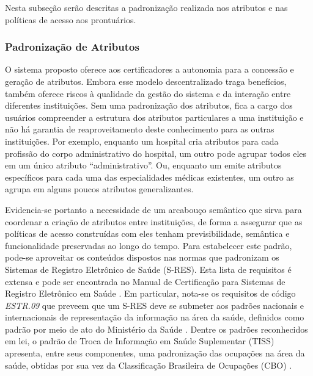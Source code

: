 \documentclass[a4paper,11pt]{article}
\begin{document}
Nesta subseção serão descritas a padronização realizada nos atributos e nas políticas de acesso aos prontuários.

\subsubsection{Padronização de Atributos}
O sistema proposto oferece aos certificadores a autonomia para a concessão e geração de atributos.
Embora esse modelo descentralizado traga benefícios, também oferece riscos à qualidade da gestão do sistema e da interação entre diferentes instituições.
Sem uma padronização dos atributos, fica a cargo dos usuários compreender a estrutura dos atributos particulares a uma instituição e não há garantia de reaproveitamento deste conhecimento para as outras instituições.%
Por exemplo, enquanto um hospital cria atributos para cada profissão do corpo administrativo do hospital, um outro pode agrupar todos eles em um único atributo ``administrativo''.
Ou, enquanto um emite atributos específicos para cada uma das especialidades médicas existentes, um outro as agrupa em alguns poucos atributos generalizantes.

Evidencia-se portanto a necessidade de um arcabouço semântico que sirva para coordenar a criação de atributos entre instituições, de forma a assegurar que as políticas de acesso construídas com eles tenham previsibilidade, semântica e funcionalidade preservadas ao longo do tempo.
Para estabelecer este padrão, pode-se aproveitar os conteúdos dispostos nas normas que padronizam os Sistemas de Registro Eletrônico de Saúde (S-RES). %
Esta lista de requisitos é extensa e pode ser encontrada no Manual de Certificação para Sistemas de Registro Eletrônico em Saúde \cite{SBIS2016}.
Em particular, nota-se os requisitos de código \emph{ESTR.09} que preveem que um S-RES deve se submeter aos padrões nacionais e internacionais de representação da informação na área da saúde, definidos como padrão por meio de ato do Ministério da Saúde \cite{MinisteriodaSaude2011}.
Dentre os padrões reconhecidos em lei, o padrão de Troca de Informação em Saúde Suplementar (TISS) \cite{ANS2020} apresenta, entre seus componentes, uma padronização das ocupações na área da saúde, obtidas por sua vez da Classificação Brasileira de Ocupações (CBO) \cite{MTE2010}.
\end{document}

